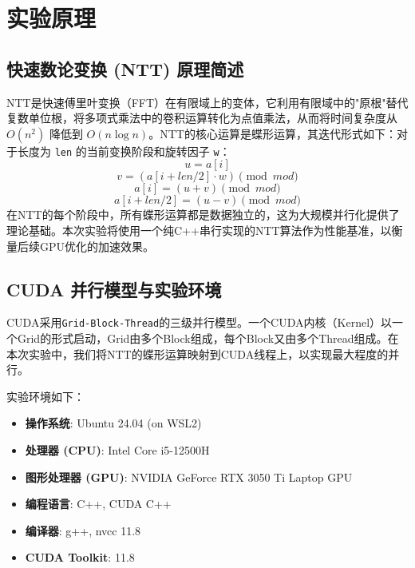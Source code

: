 \documentclass[a4paper]{article}
\begin{document}
\section{实验原理}
\subsection{快速数论变换 (NTT) 原理简述}
NTT是快速傅里叶变换（FFT）在有限域上的变体，它利用有限域中的"原根"替代复数单位根，将多项式乘法中的卷积运算转化为点值乘法，从而将时间复杂度从 \(O(n^2)\) 降低到 \(O(n \log n)\)。NTT的核心运算是蝶形运算，其迭代形式如下：对于长度为 \texttt{len} 的当前变换阶段和旋转因子 \texttt{w}：
\[ u = a[i] \]
\[ v = (a[i + len/2] \cdot w) \pmod{mod} \]
\[ a[i] = (u + v) \pmod{mod} \]
\[ a[i + len/2] = (u - v) \pmod{mod} \]
在NTT的每个阶段中，所有蝶形运算都是数据独立的，这为大规模并行化提供了理论基础。本次实验将使用一个纯C++串行实现的NTT算法作为性能基准，以衡量后续GPU优化的加速效果。

\subsection{CUDA 并行模型与实验环境}
CUDA采用\texttt{Grid-Block-Thread}的三级并行模型。一个CUDA内核（Kernel）以一个Grid的形式启动，Grid由多个Block组成，每个Block又由多个Thread组成。在本次实验中，我们将NTT的蝶形运算映射到CUDA线程上，以实现最大程度的并行。

实验环境如下：
\begin{itemize}
    \item \textbf{操作系统}: Ubuntu 24.04 (on WSL2)
    \item \textbf{处理器 (CPU)}: Intel Core i5-12500H
    \item \textbf{图形处理器 (GPU)}: NVIDIA GeForce RTX 3050 Ti Laptop GPU
    \item \textbf{编程语言}: C++, CUDA C++
    \item \textbf{编译器}: g++, nvcc 11.8
    \item \textbf{CUDA Toolkit}: 11.8
\end{itemize}
\end{document}
